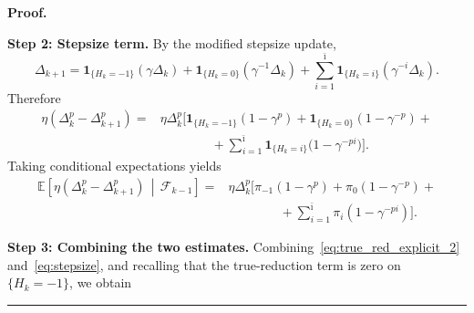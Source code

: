 \documentclass[11pt,a4paper]{article}
\newenvironment{proof}[1][Proof]{%
  \par\noindent\textbf{#1.}\ %
}{%
  \par\vspace{-0.5 ex}            %
  \noindent\hfill\rule{0.5em}{0.5em}\par
  \vspace{1ex}
}
\newcommand{\Imax}{\bar{\imath}}%
\newcommand{\Dexp}{p}
\begin{document}
\begin{proof}
\medskip
\noindent
\textbf{Step 2: Stepsize term.}
By the modified stepsize update,
\[
\Delta_{k+1}
=
\mathbf 1_{\{H_k=-1\}}(\gamma\Delta_k)
+
\mathbf 1_{\{H_k=0\}}(\gamma^{-1}\Delta_k)
+
\sum_{i=1}^{\Imax}
\mathbf 1_{\{H_k=i\}}(\gamma^{-i}\Delta_k).
\]
Therefore
\[
\begin{aligned}
\eta(\Delta_k^\Dexp-\Delta_{k+1}^\Dexp)
={}&
\eta\Delta_k^\Dexp
\Bigg[
    \mathbf 1_{\{H_k=-1\}}(1-\gamma^\Dexp)
    +
    \mathbf 1_{\{H_k=0\}}(1-\gamma^{-\Dexp})+
\\
&\qquad\qquad
    +
    \sum_{i=1}^{\Imax}
    \mathbf 1_{\{H_k=i\}}
    \bigl(1-\gamma^{-\Dexp i}\bigr)
\Bigg].
\end{aligned}
\]
Taking conditional expectations yields
\begin{equation}\label{eq:stepsize}
\begin{aligned}
\mathbb E\!\left[
    \eta(\Delta_k^\Dexp-\Delta_{k+1}^\Dexp)
    \,\middle|\,
    \mathcal F_{k-1}
\right]
={}&
\eta\Delta_k^\Dexp
\Bigg[
    \pi_{-1}(1-\gamma^\Dexp)
    +
    \pi_0(1-\gamma^{-\Dexp})+
\\
&\qquad\qquad
    +
    \sum_{i=1}^{\Imax}
    \pi_i(1-\gamma^{-\Dexp i})
\Bigg].
\end{aligned}
\end{equation}

\medskip
\noindent
\textbf{Step 3: Combining the two estimates.}
Combining~\eqref{eq:true_red_explicit_2} and~\eqref{eq:stepsize}, and recalling that the
true-reduction term is zero on $\{H_k=-1\}$, we obtain


\end{proof}
\end{document}
